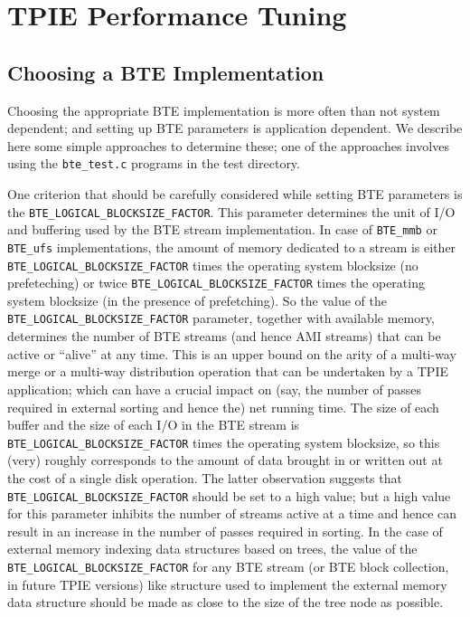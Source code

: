 \chapter{TPIE Performance Tuning}

\section{Choosing a BTE Implementation} %

Choosing the appropriate BTE implementation is more often than
not system dependent; and setting up BTE parameters is 
application dependent. We describe here some simple approaches
to determine these; one of the approaches involves using the
\verb|bte_test.c| programs in the test directory.

One criterion that should be carefully considered while setting BTE 
parameters is the \verb|BTE_LOGICAL_BLOCKSIZE_FACTOR|. This parameter
determines the unit of I/O and buffering used by the BTE stream
implementation. In case of \verb|BTE_mmb| or \verb|BTE_ufs|
implementations,  the amount of memory dedicated to a stream is 
either \verb|BTE_LOGICAL_BLOCKSIZE_FACTOR| times the operating system 
blocksize (no prefeteching) or twice  
\verb|BTE_LOGICAL_BLOCKSIZE_FACTOR| times the operating system  blocksize
(in the presence of prefetching). So the value of the
\verb|BTE_LOGICAL_BLOCKSIZE_FACTOR| parameter, together with available
memory, determines the number of BTE streams (and hence AMI streams)
that can be active or ``alive'' at any time. This is an upper bound on
the arity of a multi-way merge or a multi-way distribution operation
that can be undertaken by a TPIE application; which can have a crucial
impact on (say, the number of passes required in external sorting and
hence the) net running time. The size of each buffer and the size of
each I/O in the BTE stream is \verb|BTE_LOGICAL_BLOCKSIZE_FACTOR|
times the operating system  blocksize, so this (very) roughly
corresponds to the amount of data brought in or written out at the
cost of a single disk operation.  The latter observation suggests
that \verb|BTE_LOGICAL_BLOCKSIZE_FACTOR| should be set to a high
value; but a high value for this parameter inhibits the number of 
streams active at a time and hence can result in an increase in the
number of passes required in sorting. In the case of external memory
indexing data structures based on trees, the value of the 
\verb|BTE_LOGICAL_BLOCKSIZE_FACTOR| for any BTE stream (or BTE block
collection, in future TPIE versions) like structure used to implement 
the external memory data structure should be made as close to the size
of the tree node as possible.


